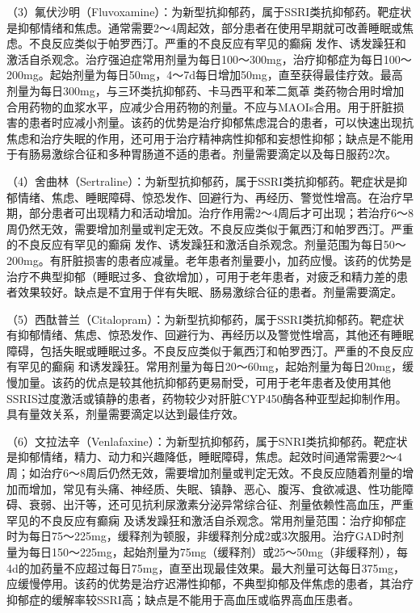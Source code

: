 （3）氟伏沙明（Fluvoxamine）：为新型抗抑郁药，属于SSRI类抗抑郁药。靶症状是抑郁情绪和焦虑。通常需要2～4周起效，部分患者在使用早期就可改善睡眠或焦虑。不良反应类似于帕罗西汀。严重的不良反应有罕见的癫痫
发作、诱发躁狂和激活自杀观念。治疗强迫症常用剂量为每日100～300mg，治疗抑郁症为每日100～200mg。起始剂量为每日50mg，4～7d每日增加50mg，直至获得最佳疗效。最高剂量为每日300mg，与三环类抗抑郁药、卡马西平和苯二氮䓬
类药物合用时增加合用药物的血浆水平，应减少合用药物的剂量。不应与MAOIs合用。用于肝脏损害的患者时应减小剂量。该药的优势是治疗抑郁焦虑混合的患者，可以快速出现抗焦虑和治疗失眠的作用，还可用于治疗精神病性抑郁和妄想性抑郁；缺点是不能用于有肠易激综合征和多种胃肠道不适的患者。剂量需要滴定以及每日服药2次。

（4）舍曲林（Sertraline）：为新型抗抑郁药，属于SSRI类抗抑郁药。靶症状是抑郁情绪、焦虑、睡眠障碍、惊恐发作、回避行为、再经历、警觉性增高。在治疗早期，部分患者可出现精力和活动增加。治疗作用需2～4周后才可出现；若治疗6～8周仍然无效，需要增加剂量或判定无效。不良反应类似于氟西汀和帕罗西汀。严重的不良反应有罕见的癫痫
发作、诱发躁狂和激活自杀观念。剂量范围为每日50～200mg。有肝脏损害的患者应减量。老年患者剂量要小，加药应慢。该药的优势是治疗不典型抑郁（睡眠过多、食欲增加），可用于老年患者，对疲乏和精力差的患者效果较好。缺点是不宜用于伴有失眠、肠易激综合征的患者。剂量需要滴定。

（5）西酞普兰（Citalopram）：为新型抗抑郁药，属于SSRI类抗抑郁药。靶症状有抑郁情绪、焦虑、惊恐发作、回避行为、再经历以及警觉性增高，其他还有睡眠障碍，包括失眠或睡眠过多。不良反应类似于氟西汀和帕罗西汀。严重的不良反应有罕见的癫痫
和诱发躁狂。常用剂量为每日20～60mg，起始剂量为每日20mg，缓慢加量。该药的优点是较其他抗抑郁药更易耐受，可用于老年患者及使用其他SSRIS过度激活或镇静的患者，药物较少对肝脏CYP450酶各种亚型起抑制作用。具有量效关系，剂量需要滴定以达到最佳疗效。

（6）文拉法辛（Venlafaxine）：为新型抗抑郁药，属于SNRI类抗抑郁药。靶症状是抑郁情绪，精力、动力和兴趣降低，睡眠障碍，焦虑。起效时间通常需要2～4周；如治疗6～8周后仍然无效，需要增加剂量或判定无效。不良反应随着剂量的增加而增加，常见有头痛、神经质、失眠、镇静、恶心、腹泻、食欲减退、性功能障碍、衰弱、出汗等，还可见抗利尿激素分泌异常综合征、剂量依赖性高血压，严重罕见的不良反应有癫痫
及诱发躁狂和激活自杀观念。常用剂量范围：治疗抑郁症时为每日75～225mg，缓释剂为顿服，非缓释剂分成2或3次服用。治疗GAD时剂量为每日150～225mg，起始剂量为75mg（缓释剂）或25～50mg（非缓释剂），每4d的加药量不应超过每日75mg，直至出现最佳效果。最大剂量可达每日375mg，应缓慢停用。该药的优势是治疗迟滞性抑郁，不典型抑郁及伴焦虑的患者，其治疗抑郁症的缓解率较SSRI高；缺点是不能用于高血压或临界高血压患者。

